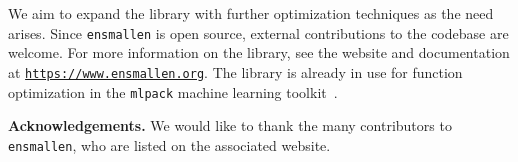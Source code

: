 \documentclass{article}
\begin{document}
We aim to expand the library with further optimization techniques
as the need arises.  Since {\tt ensmallen} is open source,
external contributions to the codebase are welcome.
For more information on the
library, see the website and documentation at
\href{https://www.ensmallen.org}{\tt\small https://www.ensmallen.org}.
The library is already in use for function optimization in the
\texttt{\small mlpack} machine learning toolkit~\cite{mlpack2018}.

% 

{\bf Acknowledgements.}
We would like to thank the many contributors to {\tt ensmallen},
who are listed on the associated website.

% 





\end{document}
